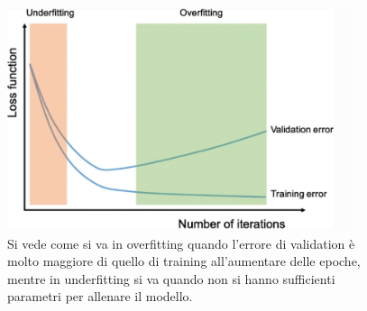    \begin{figure}[H]
      \centering
      \includegraphics[width=0.9\textwidth]{Figures/ofuf (2).PNG}
      \caption{\small{Si vede come si va in overfitting quando l'errore di validation
       è molto maggiore di quello di training all'aumentare delle epoche, mentre in underfitting 
       si va quando non si hanno sufficienti parametri per allenare il modello.\cite{tesi}
      } %
      } %
      \label{fi:dcalc}
  \end{figure}
    
